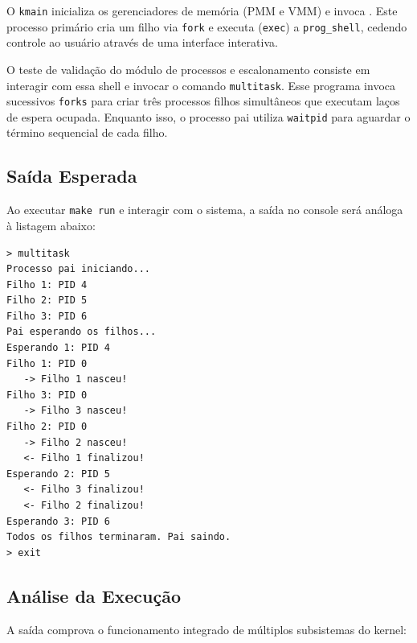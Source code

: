 O \texttt{kmain} inicializa os gerenciadores de memória 
(PMM e VMM) e invoca . Este processo 
primário cria um filho via \texttt{fork} e executa (\texttt{exec}) a 
\texttt{prog\_shell}, cedendo controle ao usuário através de uma interface interativa.

O teste de validação do módulo de processos e escalonamento consiste em interagir
com essa shell e invocar o comando \texttt{multitask}. Esse programa invoca 
sucessivos \texttt{forks} para criar três processos filhos simultâneos que executam
laços de espera ocupada. Enquanto isso, o processo pai 
utiliza \texttt{waitpid} para aguardar o término sequencial de cada filho. 

\subsection{Saída Esperada}

Ao executar \texttt{make run} e interagir com o sistema, a saída no console 
será análoga à listagem abaixo:

\lstset{captionpos=t}
\begin{lstlisting}[caption={Saída serial do QEMU executando \texttt{multitask}}]
> multitask
Processo pai iniciando...
Filho 1: PID 4
Filho 2: PID 5
Filho 3: PID 6
Pai esperando os filhos...
Esperando 1: PID 4
Filho 1: PID 0
   -> Filho 1 nasceu!
Filho 3: PID 0
   -> Filho 3 nasceu!
Filho 2: PID 0
   -> Filho 2 nasceu!
   <- Filho 1 finalizou!
Esperando 2: PID 5
   <- Filho 3 finalizou!
   <- Filho 2 finalizou!
Esperando 3: PID 6
Todos os filhos terminaram. Pai saindo.
> exit
\end{lstlisting}
\lstset{captionpos=b}

\subsection{Análise da Execução}

A saída comprova o funcionamento integrado de múltiplos subsistemas do kernel:

